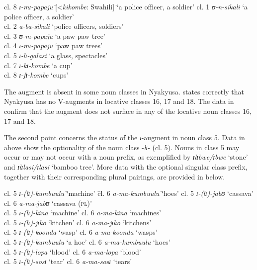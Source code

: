 \documentclass[output=paper]{langscibook}
\begin{document}
\newpage
\ea%
    \label{ex:lusekelo:4}
    \begin{tabbing}
    cl. 8 \= \textit{ɪ{}-mɪ{}-papaju} \= [<\textit{kikombe}: Swahili] \= ‘a police officer, a soldier’\kill
cl. 1 \> \textit{ʊ{}-n-sikali}  \> ‘a police officer, a soldier’ \\
  cl. 2 \> \textit{a-ba-sikali}  \> ‘police officers, soldiers’ \\
  cl. 3 \> \textit{ʊ{}-m-papaju}  \> ‘a paw paw tree’  \\
  cl. 4 \> \textit{ɪ{}-mɪ{}-papaju}  \> ‘paw paw trees’\\
  cl. 5 \>  \textit{ɪ{}-lɪ{}-}{\textit{g}}\textit{alasi}  \> ‘a glass, spectacles’ \\
  cl. 7 \> \textit{ɪ{}-kɪ{}-kombe}  \> ‘a cup’  \\
  cl. 8  \> \textit{ɪ{}-fɪ{}-kombe}  \> ‘cups’
  \end{tabbing}
\z

The augment is absent in some noun classes in Nyakyusa.  states correctly that Nyakyusa has no V-aug\-ments in locative classes 16, 17 and 18. The data in  confirm that the augment does not surface in any of the locative noun classes 16, 17 and 18.

The second point concerns the status of the \textit{ɪ}{}-augment in noun class 5. Data in  above show the optionality of the noun class -\textit{lɪ}{}- (cl. 5). Nouns in class 5 may occur or may not occur with a noun prefix, as exemplified by \textit{ɪlɪbwe/ɪbwe} ‘stone’ and \textit{ɪlɪlasi/ɪlasi} ‘bamboo tree’. More data with the optional singular class prefix, together with their corresponding plural pairings, are provided in  below. 

\ea%
    \label{ex:lusekelo:5}
    \begin{tabbing}
    cl. 5 \= \textit{ɪ{}-(lɪ){}-kumbuulu} \= ‘machine’ \=  cl. 6 \= \textit{a-ma-kumbuulu} \= ‘hoes’\kill
    cl. 5 \> \textit{ɪ{}-(lɪ){}-jabʊ} \> ‘cassava’  \> cl. 6  \> \textit{a-ma-jabʊ} \> ‘cassava (\textsc{pl})’ \\
  cl. 5 \> \textit{ɪ{}-(lɪ){}-kina} \> ‘machine’ \>  cl. 6 \> \textit{a-ma-kina} \> ‘machines’\\ 
  cl. 5 \> \textit{ɪ{}-(lɪ){}-jɪko} \> ‘kitchen’  \> cl. 6 \> \textit{a-ma-jɪko} \> ‘kitchens’ \\
  cl. 5 \> \textit{ɪ{}-(lɪ){}-koonda} \> ‘wasp’  \> cl. 6 \> \textit{a-ma-koonda} \> ‘wasps’\\ 
  cl. 5 \> \textit{ɪ{}-(lɪ){}-kumbuulu} \> ‘a hoe’  \> cl. 6 \> \textit{a-ma-kumbuulu} \> ‘hoes’ \\
  cl. 5 \> \textit{ɪ{}-(lɪ){}-lopa} \> ‘blood’  \>   cl. 6  \> \textit{a-ma-lopa} \> ‘blood’ \\
  cl. 5 \> \textit{ɪ{}-(lɪ){}-sosɪ} \> ‘tear’   \>  cl. 6 \> \textit{a-ma-sosɪ} \> ‘tears’
\end{tabbing}
\z
\end{document}
